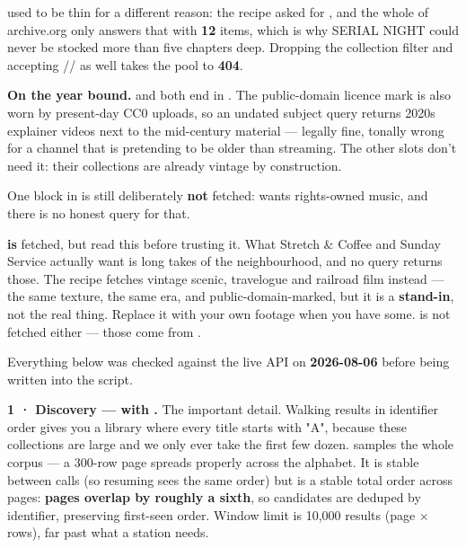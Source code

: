 \documentclass[fontpath=fonts/,logopath=logo/]{riposte-doc}
\begin{document}
 used to be thin for a different reason: the recipe asked  for , and the whole of archive.org only answers that with \textbf{12} items, which is why SERIAL NIGHT could never be stocked more than five chapters deep. Dropping the collection filter and accepting // as well takes the pool to \textbf{404}.

\textbf{On the year bound.}  and  both end in . The public-domain licence mark is also worn by present-day CC0 uploads, so an undated subject query returns 2020s explainer videos next to the mid-century material — legally fine, tonally wrong for a channel that is pretending to be older than streaming. The other slots don't need it: their collections are already vintage by construction.

One block in  is still deliberately \textbf{not} fetched:  wants rights-owned music, and there is no honest query for that.

 \textbf{is} fetched, but read this before trusting it. What Stretch \& Coffee and Sunday Service actually want is  long takes of the neighbourhood, and no query returns those. The recipe fetches vintage scenic, travelogue and railroad film instead — the same texture, the same era, and public-domain-marked, but it is a \textbf{stand-in}, not the real thing. Replace it with your own footage when you have some.  is not fetched either — those come from .



Everything below was checked against the live API on \textbf{2026-08-06} before being written into the script.

\textbf{1 · Discovery —  with .} The important detail. Walking results in identifier order gives you a library where every title starts with "A", because these collections are large and we only ever take the first few dozen.  samples the whole corpus — a 300-row page spreads properly across the alphabet. It is stable between calls (so resuming sees the same order) but is  a stable total order across pages: \textbf{pages overlap by roughly a sixth}, so candidates are deduped by identifier, preserving first-seen order. Window limit is 10,000 results (page × rows), far past what a station needs.
\end{document}
